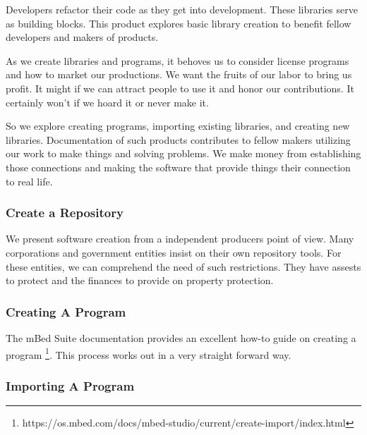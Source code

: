 \documentclass{article}
\begin{document}
Developers refactor their code as they get into development.  These libraries serve as building blocks.  This product explores basic library creation to benefit fellow developers and makers of products.

As we create libraries and programs, it behoves us to consider license programs and how to market our productions.  We want the fruits of our labor to bring us profit.  It might if we can attract people to use it and honor our contributions.  It certainly won't if we hoard it or never make it.  

So we explore creating programs, importing existing libraries, and creating new libraries.  Documentation of such products contributes to fellow makers utilizing our work to make things and solving problems.  We make money from establishing those connections and making the software that provide things their connection to real life.

\subsubsection{Create a Repository} %
\label{ssub:create_a_repository}

We present software creation from a independent producers point of view.  Many corporations and government entities insist on their own repository tools.  For these entities, we can comprehend the need of such restrictions.  They have assests to protect and the finances to provide on property protection.  


\subsubsection{Creating A Program} %
\label{ssub:creating_a_program}
The mBed Suite documentation provides an excellent how-to guide on creating a program \footnote{https://os.mbed.com/docs/mbed-studio/current/create-import/index.html}.   This process works out in a very straight forward way.  




\subsubsection{Importing A Program} %
\label{ssub:importing_a_program}

\end{document}
